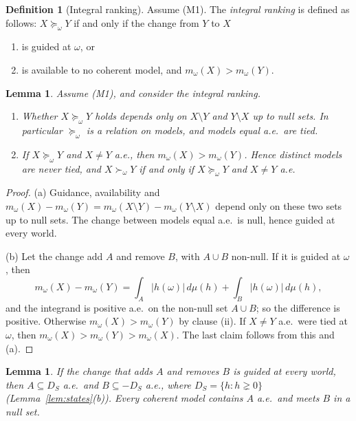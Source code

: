 \documentclass[11pt]{article}
\theoremstyle{plain}
\newtheorem{lemma}[theorem]{Lemma}
\theoremstyle{definition}
\newtheorem{definition}[theorem]{Definition}
\begin{document}
\begin{definition}[Integral ranking]\label{def:integral}
Assume (M1). The \emph{integral ranking} is defined as follows: $X\succeq_\omega Y$ if and only
if the change from $Y$ to $X$
\begin{enumerate}[label=(\roman*)]
  \item is guided at $\omega$, or
  \item is available to no coherent model, and $m_\omega(X)>m_\omega(Y)$.
\end{enumerate}
\end{definition}

\begin{lemma}\label{lem:structure}
Assume (M1), and consider the integral ranking.
\begin{enumerate}[label=(\alph*)]
  \item Whether $X\succeq_\omega Y$ holds depends only on $X\setminus Y$ and $Y\setminus X$ up
  to null sets. In particular $\succeq_\omega$ is a relation on models, and models equal a.e.\
  are tied.
  \item If $X\succeq_\omega Y$ and $X\ne Y$ a.e., then $m_\omega(X)>m_\omega(Y)$. Hence
  distinct models are never tied, and $X\succ_\omega Y$ if and only if $X\succeq_\omega Y$ and
  $X\ne Y$ a.e.
\end{enumerate}
\end{lemma}

\begin{proof}
(a) Guidance, availability and $m_\omega(X)-m_\omega(Y)=m_\omega(X\setminus Y)-m_\omega(Y
\setminus X)$ depend only on these two sets up to null sets. The change between models equal
a.e.\ is null, hence guided at every world.

(b) Let the change add $A$ and remove $B$, with $A\cup B$ non-null. If it is guided at
$\omega$, then
\[
  m_\omega(X)-m_\omega(Y)=\int_A|h(\omega)|\,d\mu(h)+\int_B|h(\omega)|\,d\mu(h),
\]
and the integrand is positive a.e.\ on the non-null set $A\cup B$; so the difference is
positive. Otherwise $m_\omega(X)>m_\omega(Y)$ by clause (ii). If $X\ne Y$ a.e.\ were tied at
$\omega$, then $m_\omega(X)>m_\omega(Y)>m_\omega(X)$. The last claim follows from this and (a).
\end{proof}

\begin{lemma}\label{lem:guidedeverywhere}
If the change that adds $A$ and removes $B$ is guided at every world, then $A\subseteq
D_S$ a.e.\ and $B\subseteq-D_S$ a.e., where $D_S=\{h:h\gneq0\}$ (Lemma~\ref{lem:states}(b)).
Every coherent model contains $A$ a.e.\ and meets $B$ in a null set.
\end{lemma}
\end{document}
